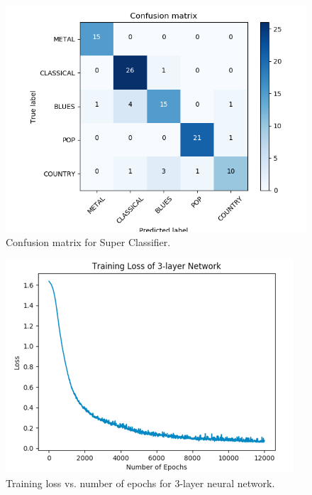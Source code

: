 \begin{figure}
\begin{center}
\includegraphics[scale=0.25]{./figures/confusion_sc.png}
\end{center}
\caption
{
Confusion matrix for Super Classifier.
}
\label{fig:big_picture5}
\end{figure}

\begin{figure}
\begin{center}
\includegraphics[scale=0.35]{./figures/3_layer_loss.png}
\end{center}
\caption
{
Training loss vs. number of epochs for 3-layer neural network.
}
\label{fig:big_picture5}
\end{figure}

